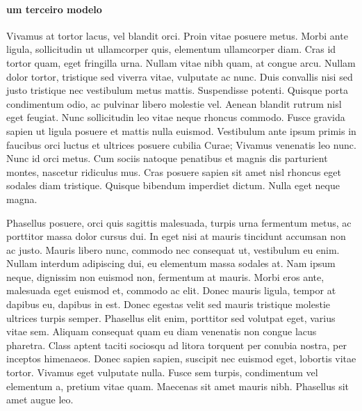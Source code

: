 \paragraph{um terceiro modelo}
Vivamus at tortor lacus, vel blandit orci. Proin vitae posuere metus. Morbi ante ligula, sollicitudin ut ullamcorper quis, elementum ullamcorper diam. Cras id tortor quam, eget fringilla urna. Nullam vitae nibh quam, at congue arcu. Nullam dolor tortor, tristique sed viverra vitae, vulputate ac nunc. Duis convallis nisi sed justo tristique nec vestibulum metus mattis. Suspendisse potenti. Quisque porta condimentum odio, ac pulvinar libero molestie vel. Aenean blandit rutrum nisl eget feugiat. Nunc sollicitudin leo vitae neque rhoncus commodo. Fusce gravida sapien ut ligula posuere et mattis nulla euismod. Vestibulum ante ipsum primis in faucibus orci luctus et ultrices posuere cubilia Curae; Vivamus venenatis leo nunc. Nunc id orci metus. Cum sociis natoque penatibus et magnis dis parturient montes, nascetur ridiculus mus. Cras posuere sapien sit amet nisl rhoncus eget sodales diam tristique. Quisque bibendum imperdiet dictum. Nulla eget neque magna.

Phasellus posuere, orci quis sagittis malesuada, turpis urna fermentum metus, ac porttitor massa dolor cursus dui. In eget nisi at mauris tincidunt accumsan non ac justo. Mauris libero nunc, commodo nec consequat ut, vestibulum eu enim. Nullam interdum adipiscing dui, eu elementum massa sodales at. Nam ipsum neque, dignissim non euismod non, fermentum at mauris. Morbi eros ante, malesuada eget euismod et, commodo ac elit. Donec mauris ligula, tempor at dapibus eu, dapibus in est. Donec egestas velit sed mauris tristique molestie ultrices turpis semper. Phasellus elit enim, porttitor sed volutpat eget, varius vitae sem. Aliquam consequat quam eu diam venenatis non congue lacus pharetra. Class aptent taciti sociosqu ad litora torquent per conubia nostra, per inceptos himenaeos. Donec sapien sapien, suscipit nec euismod eget, lobortis vitae tortor. Vivamus eget vulputate nulla. Fusce sem turpis, condimentum vel elementum a, pretium vitae quam. Maecenas sit amet mauris nibh. Phasellus sit amet augue leo. 
